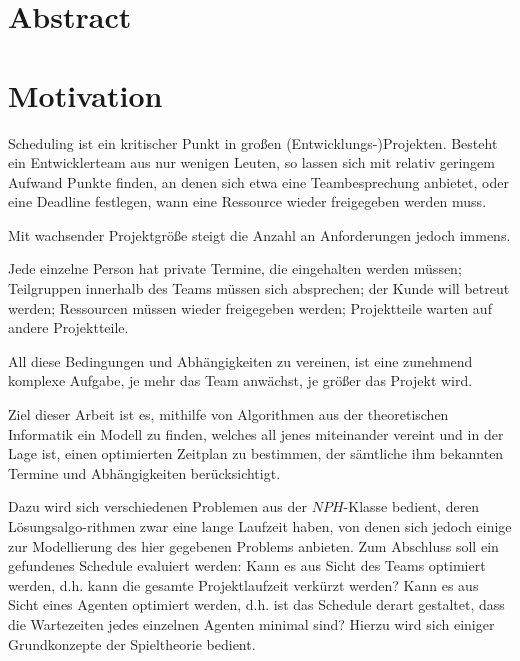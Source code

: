 \documentclass[12pt,twoside]{article}
\theoremstyle{plain}
\theoremstyle{definition}
\theoremstyle{remark}
\begin{document}
\thispagestyle{empty}
\hspace{1cm}
\newpage


\section*{Abstract}
\lipsum[99]
\setcounter{tocdepth}{2} 					%
\tableofcontents
{}
\clearpage

\section{Motivation}
\label{sec:intro}
Scheduling ist ein kritischer Punkt in großen (Entwicklungs-)Projekten.
Besteht ein Entwicklerteam aus nur wenigen Leuten, so lassen sich mit relativ geringem Aufwand Punkte finden, an denen sich etwa eine Teambesprechung anbietet, oder eine Deadline festlegen, wann eine Ressource wieder freigegeben werden muss.

Mit wachsender Projektgröße steigt die Anzahl an Anforderungen jedoch immens.

Jede einzelne Person hat private Termine, die eingehalten werden müssen; Teilgruppen innerhalb des Teams müssen sich absprechen; der Kunde will betreut werden; Ressourcen müssen wieder freigegeben werden; Projektteile warten auf andere Projektteile.

All diese Bedingungen und Abhängigkeiten zu vereinen, ist eine zunehmend komplexe Aufgabe, je mehr das Team anwächst, je größer das Projekt wird.

Ziel dieser Arbeit ist es, mithilfe von Algorithmen aus der theoretischen Informatik ein Modell zu finden, welches all jenes miteinander vereint und in der Lage ist, einen optimierten Zeitplan zu bestimmen, der sämtliche ihm bekannten Termine und Abhängigkeiten berücksichtigt.

Dazu wird sich verschiedenen Problemen aus der $NPH$-Klasse bedient, deren Lösungsalgo-rithmen zwar eine lange Laufzeit haben, von denen sich jedoch einige zur Modellierung des hier gegebenen Problems anbieten.
Zum Abschluss soll ein gefundenes Schedule evaluiert werden:
Kann es aus Sicht des Teams optimiert werden, d.h. kann die gesamte Projektlaufzeit verkürzt werden?
Kann es aus Sicht eines Agenten optimiert werden, d.h. ist das Schedule derart gestaltet, dass die Wartezeiten jedes einzelnen Agenten minimal sind?
Hierzu wird sich einiger Grundkonzepte der Spieltheorie bedient.
\end{document}

